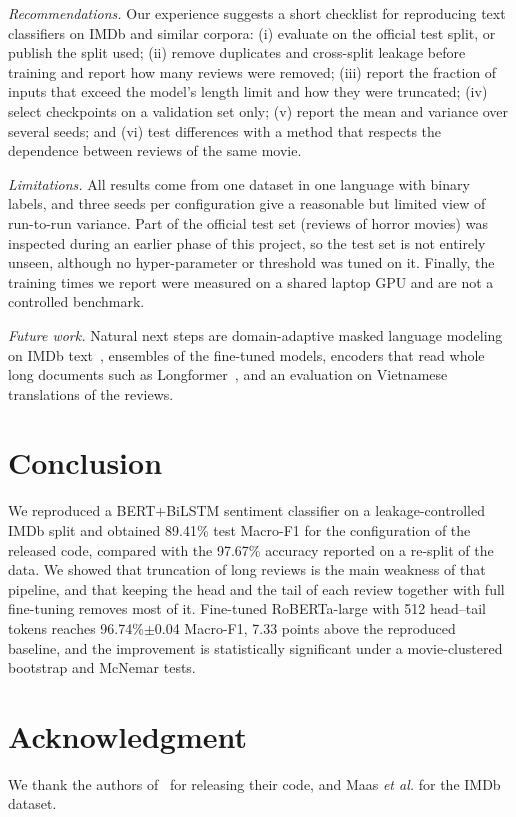 \documentclass[conference]{IEEEtran}
\begin{document}
\textit{Recommendations.} Our experience suggests a short checklist for reproducing text classifiers on IMDb and similar corpora: (i) evaluate on the official test split, or publish the split used; (ii) remove duplicates and cross-split leakage before training and report how many reviews were removed; (iii) report the fraction of inputs that exceed the model's length limit and how they were truncated; (iv) select checkpoints on a validation set only; (v) report the mean and variance over several seeds; and (vi) test differences with a method that respects the dependence between reviews of the same movie.

\textit{Limitations.} All results come from one dataset in one language with binary labels, and three seeds per configuration give a reasonable but limited view of run-to-run variance. Part of the official test set (reviews of horror movies) was inspected during an earlier phase of this project, so the test set is not entirely unseen, although no hyper-parameter or threshold was tuned on it. Finally, the training times we report were measured on a shared laptop GPU and are not a controlled benchmark.

\textit{Future work.} Natural next steps are domain-adaptive masked language modeling on IMDb text~\cite{gururangan2020}, ensembles of the fine-tuned models, encoders that read whole long documents such as Longformer~\cite{beltagy2020}, and an evaluation on Vietnamese translations of the reviews.

\section{Conclusion}
We reproduced a BERT+BiLSTM sentiment classifier on a leakage-controlled IMDb split and obtained 89.41\% test Macro-F1 for the configuration of the released code, compared with the 97.67\% accuracy reported on a re-split of the data. We showed that truncation of long reviews is the main weakness of that pipeline, and that keeping the head and the tail of each review together with full fine-tuning removes most of it. Fine-tuned RoBERTa-large with 512 head--tail tokens reaches 96.74\%$\pm$0.04 Macro-F1, 7.33 points above the reproduced baseline, and the improvement is statistically significant under a movie-clustered bootstrap and McNemar tests.

\section*{Acknowledgment}
We thank the authors of~\cite{nkhata2023} for releasing their code, and Maas \textit{et al.} for the IMDb dataset.
\end{document}
